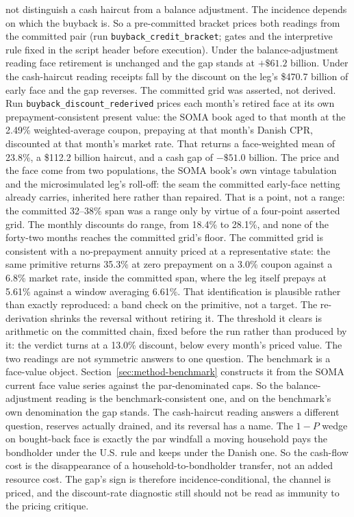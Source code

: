 \documentclass[12pt]{article}
\begin{document}
not distinguish a cash haircut from a balance adjustment. The incidence depends on which the buyback is. So a pre-committed bracket prices both readings from the committed pair (run \texttt{buyback\_credit\_bracket}; gates and the interpretive rule fixed in the script header before execution). Under the balance-adjustment reading face retirement is unchanged and the gap stands at $+\$61.2$ billion. Under the cash-haircut reading receipts fall by the discount on the leg's \$470.7 billion of early face and the gap reverses. The committed grid was asserted, not derived. Run \texttt{buyback\_discount\_rederived} prices each month's retired face at its own prepayment-consistent present value: the SOMA book aged to that month at the 2.49\% weighted-average coupon, prepaying at that month's Danish CPR, discounted at that month's market rate. That returns a face-weighted mean of 23.8\%, a \$112.2 billion haircut, and a cash gap of $-\$51.0$ billion. The price and the face come from two populations, the SOMA book's own vintage tabulation and the microsimulated leg's roll-off: the seam the committed early-face netting already carries, inherited here rather than repaired. That is a point, not a range: the committed 32--38\% span was a range only by virtue of a four-point asserted grid. The monthly discounts do range, from 18.4\% to 28.1\%, and none of the forty-two months reaches the committed grid's floor. The committed grid is consistent with a no-prepayment annuity priced at a representative state: the same primitive returns 35.3\% at zero prepayment on a 3.0\% coupon against a 6.8\% market rate, inside the committed span, where the leg itself prepays at 5.61\% against a window averaging 6.61\%. That identification is plausible rather than exactly reproduced: a band check on the primitive, not a target. The re-derivation shrinks the reversal without retiring it. The threshold it clears is arithmetic on the committed chain, fixed before the run rather than produced by it: the verdict turns at a 13.0\% discount, below every month's priced value. The two readings are not symmetric answers to one question. The benchmark is a face-value object. Section~\ref{sec:method-benchmark} constructs it from the SOMA current face value series against the par-denominated caps. So the balance-adjustment reading is the benchmark-consistent one, and on the benchmark's own denomination the gap stands. The cash-haircut reading answers a different question, reserves actually drained, and its reversal has a name. The $1-P$ wedge on bought-back face is exactly the par windfall a moving household pays the bondholder under the U.S. rule and keeps under the Danish one. So the cash-flow cost is the disappearance of a household-to-bondholder transfer, not an added resource cost. The gap's sign is therefore incidence-conditional, the channel is priced, and the discount-rate diagnostic still should not be read as immunity to the pricing critique.
\end{document}

